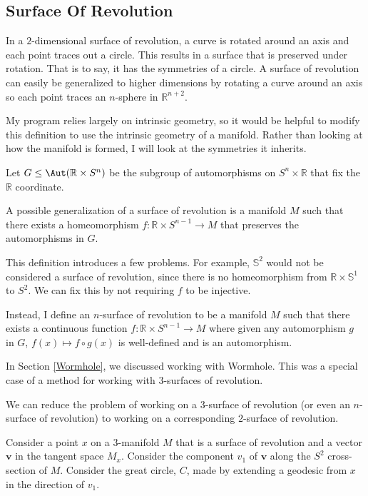 \subsection{Surface Of Revolution}

In a $2$-dimensional surface of revolution, a curve is rotated around an axis and each point traces out a circle. This results in a surface that is preserved under rotation. That is to say, it has the symmetries of a circle. A surface of revolution can easily be generalized to higher dimensions by rotating a curve around an axis so each point traces an $n$-sphere in $\mathbb{R}^{n+2}$.

My program relies largely on intrinsic geometry, so it would be helpful to modify this definition to use the intrinsic geometry of a manifold. Rather than looking at how the manifold is formed, I will look at the symmetries it inherits.

Let $G \leq \Aut(\mathbb{R} \times S^n)$ be the subgroup of automorphisms on $S^n \times \mathbb{R}$ that fix the $\mathbb{R}$ coordinate.

A possible generalization of a surface of revolution is a manifold $M$ such that there exists a homeomorphism $f:\mathbb{R} \times S^{n-1} \to M$ that preserves the automorphisms in $G$.

This definition introduces a few problems. For example, $\mathbb{S}^2$ would not be considered a surface of revolution, since there is no homeomorphism from $\mathbb{R} \times \mathbb{S}^1$ to $S^2$. We can fix this by not requiring $f$ to be injective.

Instead, I define an $n$-surface of revolution to be a manifold $M$ such that there exists a continuous function $f:\mathbb{R} \times S^{n-1} \to M$ where given any automorphism $g$ in $G$, $f(x) \mapsto f \circ g(x)$ is well-defined and is an automorphism.

In Section \ref{Wormhole}, we discussed working with Wormhole. This was a special case of a method for working with $3$-surfaces of revolution.

We can reduce the problem of working on a $3$-surface of revolution (or even an $n$-surface of revolution) to working on a corresponding $2$-surface of revolution.

Consider a point $x$ on a $3$-manifold $M$ that is a surface of revolution and a vector $\textbf{v}$ in the tangent space $M_x$. Consider the component $v_1$ of $\textbf{v}$ along the $S^2$ cross-section of $M$. Consider the great circle, $C$, made by extending a geodesic from $x$ in the direction of $v_1$.

